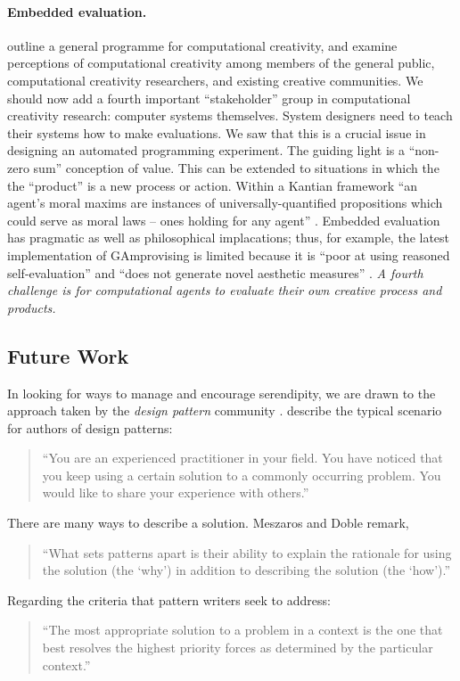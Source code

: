 \paragraph{\textbf{Embedded evaluation}.}   outline a general programme
  for computational creativity, and examine perceptions of
  computational creativity among members of the general public,
  computational creativity researchers, and existing creative
  communities.  We should now add a fourth important ``stakeholder''
  group in computational creativity research: computer systems
  themselves.  System designers need to teach their systems how to
  make evaluations.  We saw that this is a crucial issue in designing
  an automated programming experiment.  The guiding light is a
  ``non-zero sum'' conception of value.  This can be extended to
  situations in which the the ``product'' is a new process or action.
  Within a Kantian framework ``an agent's moral maxims are instances
  of universally-quantified propositions which could serve as moral
  laws -- ones holding for any agent'' \cite{powers2005deontological}.
  Embedded evaluation has pragmatic as well as philosophical
  implacations; thus, for example, the latest implementation of {\sf
    GAmprovising} is limited because it is ``poor at using reasoned
  self-evaluation'' and ``does not generate novel aesthetic measures''
  \cite[pp.~189, 288]{jordanous2012evaluating}.  \emph{A fourth
    challenge is for computational agents to evaluate their own
    creative process and products.}

\subsection{Future Work} \label{sec:futurework} \label{sec:hatching}

In looking for ways to manage and encourage serendipity, we are drawn
to the approach taken by the \emph{design pattern} community
\cite{alexander1999origins}. 
 describe the typical scenario for authors of design patterns:

\begin{quote}
\noindent ``You are an experienced practitioner in your field.  You
have noticed that you keep using a certain solution to a commonly
occurring problem.  You would like to share your experience with
others.''
\end{quote}

\noindent There are many ways to describe a solution. Meszaros and Doble remark,
\begin{quote}
\noindent ``What sets patterns apart is their ability to explain the
rationale for using the solution (the `why') in addition to describing
the solution (the `how').''
\end{quote}
Regarding the criteria that pattern writers seek to address: 
\begin{quote}
\noindent ``The most appropriate solution to a problem in a context is
the one that best resolves the highest priority forces as determined
by the particular context.''
\end{quote}


